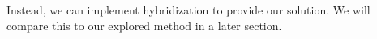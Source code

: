 \documentclass[11pt]{article}
\begin{document}
Instead, we can implement hybridization to provide our solution. We will compare this to our explored method in a later section.


\end{document}
